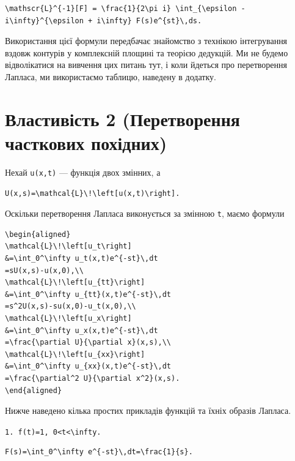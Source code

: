 \documentclass[
  ukrainian,
]{article}
\begin{document}
\begin{verbatim}
\mathscr{L}^{-1}[F] = \frac{1}{2\pi i} \int_{\epsilon - i\infty}^{\epsilon + i\infty} F(s)e^{st}\,ds.
\end{verbatim}

Використання цієї формули передбачає знайомство з технікою інтегрування
вздовж контурів у комплексній площині та теорією дедукцій. Ми не будемо
відволікатися на вивчення цих питань тут, і коли йдеться про
перетворення Лапласа, ми використаємо таблицю, наведену в додатку.

\section{Властивість 2 (Перетворення часткових
похідних)}\label{ux432ux43bux430ux441ux442ux438ux432ux456ux441ux442ux44c-2-ux43fux435ux440ux435ux442ux432ux43eux440ux435ux43dux43dux44f-ux447ux430ux441ux442ux43aux43eux432ux438ux445-ux43fux43eux445ux456ux434ux43dux438ux445}

Нехай \texttt{u(x,t)} --- функція двох змінних, а

\begin{verbatim}
U(x,s)=\mathcal{L}\!\left[u(x,t)\right].
\end{verbatim}

Оскільки перетворення Лапласа виконується за змінною \texttt{t}, маємо
формули

\begin{verbatim}
\begin{aligned}
\mathcal{L}\!\left[u_t\right]
&=\int_0^\infty u_t(x,t)e^{-st}\,dt
=sU(x,s)-u(x,0),\\
\mathcal{L}\!\left[u_{tt}\right]
&=\int_0^\infty u_{tt}(x,t)e^{-st}\,dt
=s^2U(x,s)-su(x,0)-u_t(x,0),\\
\mathcal{L}\!\left[u_x\right]
&=\int_0^\infty u_x(x,t)e^{-st}\,dt
=\frac{\partial U}{\partial x}(x,s),\\
\mathcal{L}\!\left[u_{xx}\right]
&=\int_0^\infty u_{xx}(x,t)e^{-st}\,dt
=\frac{\partial^2 U}{\partial x^2}(x,s).
\end{aligned}
\end{verbatim}

Нижче наведено кілька простих прикладів функцій та їхніх образів
Лапласа.

\texttt{1.\ \textquotesingle{}f(t)=1\textquotesingle{},\ \textquotesingle{}0\textless{}t\textless{}\textbackslash{}infty\textquotesingle{}.}

\begin{verbatim}
F(s)=\int_0^\infty e^{-st}\,dt=\frac{1}{s}.
\end{verbatim}
\end{document}
